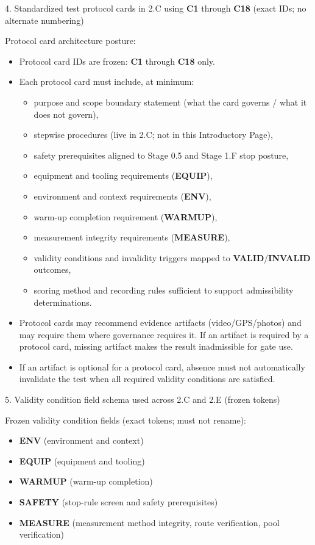\documentclass[10pt]{article}
\begin{document}
4. Standardized test protocol cards in 2.C using \textbf{C1} through \textbf{C18} (exact IDs; no alternate numbering)

Protocol card architecture posture:

\begin{itemize}
\item Protocol card IDs are frozen: \textbf{C1} through \textbf{C18} only.
\item Each protocol card must include, at minimum:
  \begin{itemize}
  \item purpose and scope boundary statement (what the card governs / what it does not govern),
  \item stepwise procedures (live in 2.C; not in this Introductory Page),
  \item safety prerequisites aligned to Stage 0.5 and Stage 1.F stop posture,
  \item equipment and tooling requirements (\textbf{EQUIP}),
  \item environment and context requirements (\textbf{ENV}),
  \item warm-up completion requirement (\textbf{WARMUP}),
  \item measurement integrity requirements (\textbf{MEASURE}),
  \item validity conditions and invalidity triggers mapped to \textbf{VALID}/\textbf{INVALID} outcomes,
  \item scoring method and recording rules sufficient to support admissibility determinations.
  \end{itemize}
\item Protocol cards may recommend evidence artifacts (video/GPS/photos) and may require them where governance requires it. If an artifact is required by a protocol card, missing artifact makes the result inadmissible for gate use.
\item If an artifact is optional for a protocol card, absence must not automatically invalidate the test when all required validity conditions are satisfied.
\end{itemize}

5. Validity condition field schema used across 2.C and 2.E (frozen tokens)

Frozen validity condition fields (exact tokens; must not rename):

\begin{itemize}
\item \textbf{ENV} (environment and context)
\item \textbf{EQUIP} (equipment and tooling)
\item \textbf{WARMUP} (warm-up completion)
\item \textbf{SAFETY} (stop-rule screen and safety prerequisites)
\item \textbf{MEASURE} (measurement method integrity, route verification, pool verification)
\end{itemize}
\end{document}
